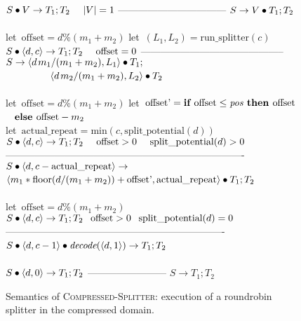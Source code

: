 \begin{figure}[t]
$S \bullet V \rightarrow T_1; T_2~~~~|V|=1$\skiptopb
---------------------------------\skipbot
$S \rightarrow V \bullet T_1; T_2$
~ \\ ~ \\
let~$\mbox{offset} = d$\%$(m_1+m_2)$\skiptopb
let~$(L_1, L_2) = \mbox{run\_splitter}(c)$\vspace{2pt}\\
$S \bullet \langle d, c\rangle \rightarrow T_1; T_2~~~~\mbox{offset} = 0$\vspace{-3pt}\skiptopa
--------------------------------------------\skipbot
$S \rightarrow \langle d{\hspace{1.3pt}}m_1/(m_1+m_2), L_1\rangle \bullet T_1;$\\
\mbox{~~~~~~~~~}\hspace{0.29pt}$\langle d{\hspace{1.3pt}}m_2/(m_1+m_2), L_2\rangle \bullet T_2$
~ \\ ~ \\
let~$\mbox{offset} = d$\%$(m_1+m_2)$\skiptopb
let~$\mbox{offset'} = \mbox{\bf if~} \mbox{offset} \leq \mbox{\it pos} \mbox{\bf ~then~} \mbox{offset}$\\
\mbox{~}\hspace{42.3pt}$\mbox{\bf ~else~} \mbox{offset} - m_2$\\
let~$\mbox{actual\_repeat} = \mbox{min}(c, \mbox{split\_potential}(d))$\\
$S \bullet \langle d, c\rangle \rightarrow T_1; T_2~~~~\mbox{offset} > 0~~~~\mbox{split\_potential}(d) > 0$\skiptopb
-------------------------------------------------------------------------\skipbot
$S \bullet \langle d, c - \mbox{actual\_repeat}\rangle \rightarrow$\\
$\langle m_1*\mbox{floor}(d / (m_1 + m_2)) + \mbox{offset'}, \mbox{actual\_repeat}\rangle \bullet T_1; T_2$
~ \\ ~ \\
let~$\mbox{offset} = d$\%$(m_1+m_2)$\skiptopb
$S \bullet \langle d, c\rangle \rightarrow T_1; T_2~~\hspace{1pt}\mbox{offset} > 0~~\hspace{1pt}\mbox{split\_potential}(d) = 0$\skiptopb
-------------------------------------------------------------------\skipbot
$S \bullet \langle d, c-1\rangle \bullet \mbox{\it decode}(\langle d, 1\rangle) \rightarrow T_1; T_2$
~ \\ ~ \\
$S \bullet \langle d, 0\rangle \rightarrow T_1; T_2$\skiptopb
------------------------\skipbot
$S \rightarrow T_1; T_2$
\caption{Semantics of \textsc{Compressed-Splitter}:  execution of a roundrobin
splitter in the compressed domain.
\protect\label{fig:compressed-splitter}}
\end{figure}

